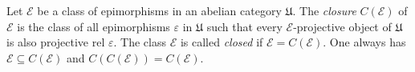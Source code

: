 Let $\mathcal{E}$ be a class of epimorphisms in an abelian category $\mathfrak{U}$. The \emph{closure} $C(\mathcal{E})$ of $\mathcal{E}$ is the class of all epimorphisms $\varepsilon$ in $\mathfrak{U}$ such that every $\mathcal{E}$-projective object of $\mathfrak{U}$ is also projective rel $\varepsilon$. The class $\mathcal{E}$ is called \emph{closed} if $\mathcal{E} = C(\mathcal{E})$. One always has $\mathcal{E} \subseteq C(\mathcal{E})$ and $C(C(\mathcal{E})) = C(\mathcal{E})$.